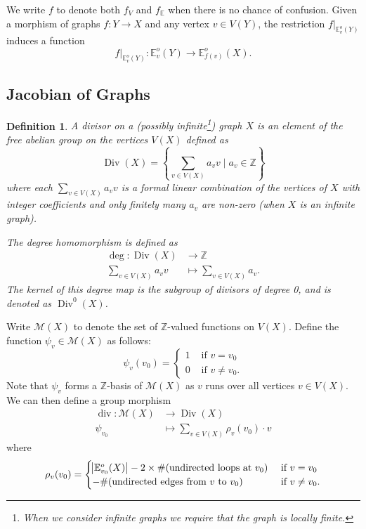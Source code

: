 \documentclass{amsart}
\newtheorem{definition}[theorem]{Definition}
\numberwithin{equation}{section}
\theoremstyle{remark}
\newcommand{\Div}{\operatorname{Div}}
\newcommand{\Z}{\mathbb{Z}}
\newcommand{\E}{\mathbb{E}}
\theoremstyle{plain} %
\begin{document}
We write $f$ to denote both $f_V$ and $f_{\E}$ when there is no chance of confusion.
Given a morphism of graphs $f \colon Y \to X$ and any vertex $v \in V(Y)$, the restriction $f\vert_{\E^{o}_v(Y)}$ induces a function \[
f\vert_{\E^o_v(Y)} \colon \E^o_v(Y) \longrightarrow \E^o_{f(v)}(X).
\]



\subsection{Jacobian of Graphs}
\label{Jacobian sec}
\begin{definition}
A \emph{divisor} on a (possibly infinite\footnote{When we consider infinite graphs we require that the graph is locally finite.}) graph $X$ is an element of the free abelian group on the vertices $V (X)$ defined as
\[
\Div(X) = \left\{ \sum_{v\in V (X)}
a_v v \mid  a_v \in \Z\right\}
\]
where each $\sum_{v\in V (X)}a_v v$ is a formal linear combination of the vertices of $X$ with integer coefficients and only finitely many $a_v$ are non-zero (when $X$ is an infinite graph).


The \emph{degree homomorphism} is defined as
\begin{align*}
\deg \colon \Div(X) &\longrightarrow \Z\\
\sum_{v\in V (X)}a_v v &\mapsto \sum_{v\in V(X)} a_v.
\end{align*}
The kernel of this degree map is the subgroup of divisors of degree 0, and is denoted as $\Div^0(X)$.
\end{definition}

{Write $\mathcal{M}(X)$ to denote the set of $\Z$-valued functions on $V(X)$.
Define the function $\psi_v\in \mathcal{M}(X)$ as follows:
\[
\psi_v(v_0) = \begin{cases}
1 & \text{ if } v = v_0 \\
0 & \text{ if } v \neq v_0.
\end{cases}
\]
Note that $\psi_v$ forms a $\Z$-basis of $\mathcal{M}(X)$ as $v$ runs over all vertices $v\in V(X)$.
We can then define a group morphism
\begin{align*}
    \operatorname{div}: \mathcal{M}(X) & \longrightarrow \Div(X)\\
    \psi_{v_0} & \mapsto \sum_{v\in V(X)} \rho_{v}(v_0) \cdot v
\end{align*}
where
\[
\rho_v(v_0) = \begin{cases}
    \abs{\E_{v_0}^o(X)} - 2\times \#(\text{undirected loops at }v_0) & \text{ if } v=v_0\\
    -\#(\text{undirected edges from }v \text{ to }v_0) & \text{ if } v\neq v_0.
\end{cases}
\]}
\end{document}
